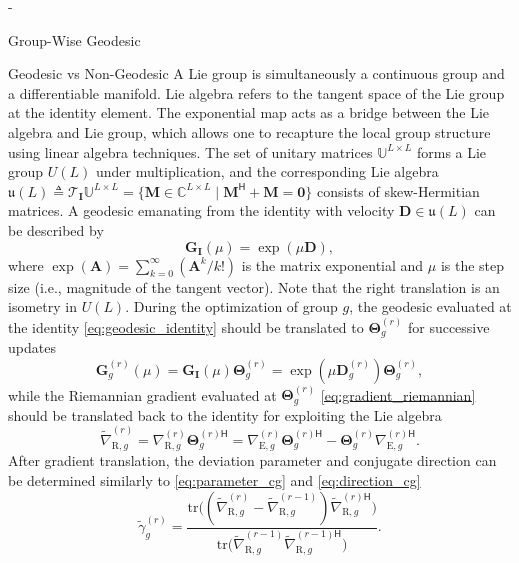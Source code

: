 \begin{section}{-}
\begin{subsection}{Group-Wise Geodesic }
\begin{subsubsection}{Geodesic vs Non-Geodesic }
			A Lie group is simultaneously a continuous group and a differentiable manifold.
			Lie algebra refers to the tangent space of the Lie group at the identity element.
			The exponential map acts as a bridge between the Lie algebra and Lie group, which allows one to recapture the local group structure using linear algebra techniques.
			The set of unitary matrices $\mathbb{U}^{L \times L}$ forms a Lie group $U(L)$ under multiplication, and the corresponding Lie algebra $\mathfrak{u}(L) \triangleq \mathcal{T}_{\mathbf{I}}\mathbb{U}^{L \times L} = \{\mathbf{M} \in \mathbb{C}^{L \times L} \mid \mathbf{M}^\mathsf{H} + \mathbf{M} = \mathbf{0}\}$ consists of skew-Hermitian matrices.
			A geodesic emanating from the identity with velocity $\mathbf{D} \in \mathfrak{u}(L)$ can be described by \cite{Edelman1998}
			\begin{equation}
				\mathbf{G}_\mathbf{I}(\mu) = \exp(\mu \mathbf{D}),
				\label{eq:geodesic_identity}
			\end{equation}
			where $\exp(\mathbf{A}) = \sum_{k=0}^\infty (\mathbf{A}^k/k!)$ is the matrix exponential and $\mu$ is the step size (i.e., magnitude of the tangent vector).
			Note that the right translation is an isometry in $U(L)$.
			During the optimization of group $g$, the geodesic evaluated at the identity \eqref{eq:geodesic_identity} should be translated to $\mathbf{\Theta}_g^{(r)}$ for successive updates \cite{Abrudan2008}
			\begin{equation}
				\mathbf{G}_g^{(r)}(\mu) = \mathbf{G}_\mathbf{I}(\mu) \mathbf{\Theta}_g^{(r)} = \exp(\mu \mathbf{D}_g^{(r)}) \mathbf{\Theta}_g^{(r)},
				\label{eq:geodesic_translated}
			\end{equation}
			while the Riemannian gradient evaluated at $\mathbf{\Theta}_g^{(r)}$ \eqref{eq:gradient_riemannian} should be translated back to the identity for exploiting the Lie algebra \cite{Abrudan2008}
			\begin{equation}
				\tilde{\nabla}_{\mathrm{R},g}^{(r)} = \nabla_{\mathrm{R},g}^{(r)} \mathbf{\Theta}_g^{(r)\mathsf{H}} = \nabla_{\mathrm{E},g}^{(r)} \mathbf{\Theta}_g^{(r)\mathsf{H}} - \mathbf{\Theta}_g^{(r)} {\nabla_{\mathrm{E},g}^{(r)\mathsf{H}}}.
				\label{eq:gradient_translated}
			\end{equation}
			After gradient translation, the deviation parameter and conjugate direction can be determined similarly to \eqref{eq:parameter_cg} and \eqref{eq:direction_cg}
			\begin{equation}
				\tilde{\gamma}_g^{(r)} = \frac{\mathrm{tr}\bigl((\tilde{\nabla}_{\mathrm{R},g}^{(r)} - \tilde{\nabla}_{\mathrm{R},g}^{(r-1)}) {\tilde{\nabla}_{\mathrm{R},g}^{(r)\mathsf{H}}}\bigr)}{\mathrm{tr}\bigl(\tilde{\nabla}_{\mathrm{R},g}^{(r-1)} {\tilde{\nabla}_{\mathrm{R},g}^{(r-1)\mathsf{H}}}\bigr)}. %

\end{equation}
\end{subsubsection}
\end{subsection}
\end{section}

